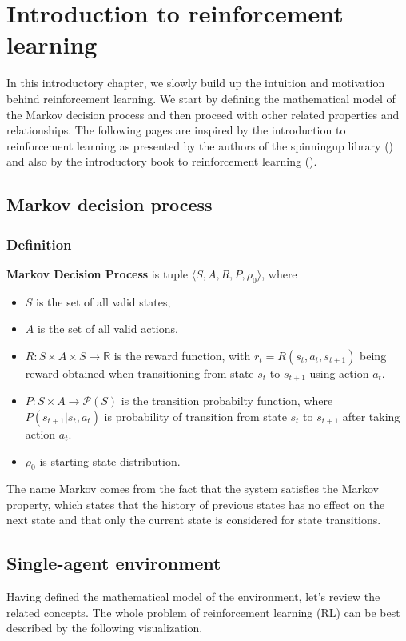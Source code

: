 \chapter{Introduction to reinforcement learning}\label{IntroductionChapter}

In this introductory chapter, we slowly build up the intuition and motivation behind reinforcement learning.
We start by defining the mathematical model of the Markov decision process and then proceed with other related properties and relationships.
The following pages are inspired by the introduction to reinforcement learning as presented by the authors of the spinningup library (\cite{SpinningUpIntro}) and also by the introductory book to reinforcement learning (\cite{sutton2018reinforcement}).

\section{Markov decision process}
\subsection*{Definition}

\label{MDP} \textbf{Markov Decision Process} is tuple $\langle S, A, R, P, \rho_0\rangle$, where
\begin{itemize}
    \item $S$ is the set of all valid states,
    \item $A$ is the set of all valid actions,
    \item $R: S \times A \times S \rightarrow \mathbb{R}$ is the reward function, with $r_t=R(s_t, a_t,s_{t+1})$ being reward obtained when transitioning from state $s_t$ to $s_{t+1}$ using action $a_t$.
    \item $P: S \times A \rightarrow \mathcal{P}(S)$ is the transition probabilty function, where $P(s_{t+1}|s_t, a_t)$ is probability of transition from state $s_t$ to $s_{t+1}$ after taking action $a_t$. 
    \item $\rho_0$ is starting state distribution.
\end{itemize}
The name Markov comes from the fact that the system satisfies the Markov property, which states that the history of previous states has no effect on the next state and that only the current state is considered for state transitions.

\section{Single-agent environment}
Having defined the mathematical model of the environment, let's review the related concepts.
The whole problem of reinforcement learning (RL) can be best described by the following visualization.

